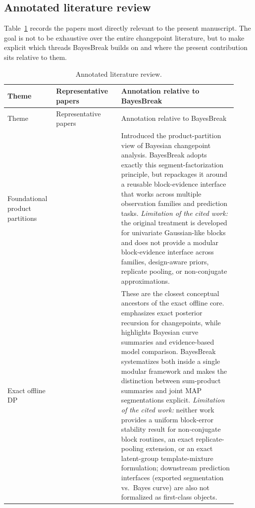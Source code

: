 \subsection{Annotated literature review}
\label{app:annotated-lit}

Table~\ref{tab:annotated-lit} records the papers most directly relevant to the present manuscript.
The goal is not to be exhaustive over the entire changepoint literature, but to make explicit which
threads BayesBreak builds on and where the present contribution sits relative to them.

\begin{longtable}{p{0.17\linewidth}p{0.27\linewidth}p{0.48\linewidth}}
\caption{Annotated literature review.}\label{tab:annotated-lit}\\
\toprule
Theme & Representative papers & Annotation relative to BayesBreak \\
\midrule
\endfirsthead
\toprule
Theme & Representative papers & Annotation relative to BayesBreak \\
\midrule
\endhead

Foundational product partitions &
\citet{barry1992ppm, barry1993bayesCP} &
Introduced the product-partition view of Bayesian changepoint analysis. BayesBreak adopts exactly
this segment-factorization principle, but repackages it around a reusable block-evidence interface
that works across multiple observation families and prediction tasks. \emph{Limitation of the cited
work:} the original treatment is developed for univariate Gaussian-like blocks and does not provide a
modular block-evidence interface across families, design-aware priors, replicate pooling, or
non-conjugate approximations. \\

Exact offline DP &
\citet{fearnhead2006exact, hutter2006bpcr} &
These are the closest conceptual ancestors of the exact offline core. \citet{fearnhead2006exact}
emphasizes exact posterior recursion for changepoints, while \citet{hutter2006bpcr} highlights
Bayesian curve summaries and evidence-based model comparison. BayesBreak systematizes both inside a
single modular framework and makes the distinction between sum-product summaries and joint MAP
segmentations explicit. \emph{Limitation of the cited work:} neither work provides a uniform
block-error stability result for non-conjugate block routines, an exact replicate-pooling extension,
or an exact latent-group template-mixture formulation; downstream prediction interfaces (exported
segmentation vs.\ Bayes curve) are also not formalized as first-class objects. \\


\end{longtable}
